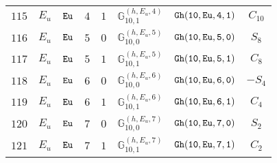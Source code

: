 \documentclass[fleqn,8pt]{jsarticle}
\begin{document}
\begin{table}[ht!]
\begin{center}
\begin{tabular}{cccccccc}
$ 115 $ & $ E_{u} $ & $ {\tt Eu} $ & $ 4 $ & $ 1 $ & $ \mathbb{G}_{10,1}^{(h,E_{u},4)} $ & $ {\tt Gh(10,Eu,4,1)} $ & $ C_{10} $ \\
$ 116 $ & $ E_{u} $ & $ {\tt Eu} $ & $ 5 $ & $ 0 $ & $ \mathbb{G}_{10,0}^{(h,E_{u},5)} $ & $ {\tt Gh(10,Eu,5,0)} $ & $ S_{8} $ \\
$ 117 $ & $ E_{u} $ & $ {\tt Eu} $ & $ 5 $ & $ 1 $ & $ \mathbb{G}_{10,1}^{(h,E_{u},5)} $ & $ {\tt Gh(10,Eu,5,1)} $ & $ C_{8} $ \\
$ 118 $ & $ E_{u} $ & $ {\tt Eu} $ & $ 6 $ & $ 0 $ & $ \mathbb{G}_{10,0}^{(h,E_{u},6)} $ & $ {\tt Gh(10,Eu,6,0)} $ & $ - S_{4} $ \\
$ 119 $ & $ E_{u} $ & $ {\tt Eu} $ & $ 6 $ & $ 1 $ & $ \mathbb{G}_{10,1}^{(h,E_{u},6)} $ & $ {\tt Gh(10,Eu,6,1)} $ & $ C_{4} $ \\
$ 120 $ & $ E_{u} $ & $ {\tt Eu} $ & $ 7 $ & $ 0 $ & $ \mathbb{G}_{10,0}^{(h,E_{u},7)} $ & $ {\tt Gh(10,Eu,7,0)} $ & $ S_{2} $ \\
$ 121 $ & $ E_{u} $ & $ {\tt Eu} $ & $ 7 $ & $ 1 $ & $ \mathbb{G}_{10,1}^{(h,E_{u},7)} $ & $ {\tt Gh(10,Eu,7,1)} $ & $ C_{2} $ \\
 \hline \hline
\end{tabular}
\end{center}
\end{table}
\end{document}
